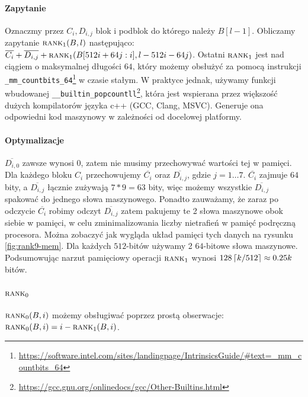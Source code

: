 \paragraph{Zapytanie}
Oznaczmy przez $C_i, D_{i,j}$ blok i podblok do którego należy $B[l-1]$. Obliczamy zapytanie $\textsc{rank}_1(B,l)$ następująco: $\overline{C_i} + \overline{D_{i,j}} + \textsc{rank}_1(B[512i+64j:i], l-512i-64j)$. Ostatni $\textsc{rank}_1$ jest nad ciągiem o maksymalnej długości $64$, który możemy obsłużyć za pomocą instrukcji \lstinline{_mm_countbits_64}\footnote{\url{https://software.intel.com/sites/landingpage/IntrinsicsGuide/\#text=_mm_countbits_64}} w czasie stałym. W praktyce jednak, używamy funkcji wbudowanej \lstinline{__builtin_popcountll}\footnote{\url{https://gcc.gnu.org/onlinedocs/gcc/Other-Builtins.html}}, która jest wspierana przez większość dużych kompilatorów języka c++ (GCC, Clang, MSVC). Generuje ona odpowiedni kod maszynowy w zależności od docelowej platformy.

\paragraph{Optymalizacje}
 $\overline{D_{i,0}}$ zawsze wynosi 0, zatem nie musimy przechowywać wartości tej w pamięci. Dla każdego bloku $C_i$ przechowujemy $\overline{C_i}$ oraz $\overline{D_{i,j}}$, gdzie $j=1\dots7$. $\overline{C_i}$ zajmuje $64$ bity, a $\overline{D_{i,j}}$ łącznie zużywają $7*9=63$ bity, więc możemy wszystkie $\overline{D_{i,j}}$ spakować do jednego słowa maszynowego. Ponadto zauważamy, że zaraz po odczycie $\overline{C_i}$ robimy odczyt $\overline{D_{i,j}}$ zatem pakujemy te 2 słowa maszynowe obok siebie w pamięci, w celu zminimalizowania liczby nietrafień w pamięć podręczną procesora. Można zobaczyć jak wygląda układ pamięci tych danych na rysunku \ref{fig:rank9-mem}. Dla każdych $512$-bitów używamy 2 $64$-bitowe słowa maszynowe. Podsumowując narzut pamięciowy operacji $\textsc{rank}_1$ wynosi $128\left\lceil k/512\right\rceil \approx 0.25k$ bitów.

\paragraph{$\textsc{rank}_0$} $\textsc{rank}_0(B, i)$ możemy obsługiwać poprzez prostą obserwacje: $\textsc{rank}_0(B, i) = i - \textsc{rank}_1(B, i)$.

